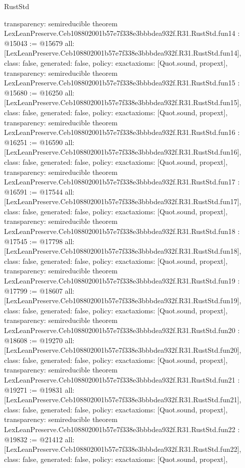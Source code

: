 \begin{lexlean}{RustStd}
\begin{coremodule}
{  transparency: semireducible
}
theorem LexLeanPreserve.Ceb108802001b57e7f338e3bbbdea932f.R31.RustStd.fun14 : @15043 := @15679 {
  all: [LexLeanPreserve.Ceb108802001b57e7f338e3bbbdea932f.R31.RustStd.fun14],
  class: false,
  generated: false,
  policy: exact{axioms: [Quot.sound, propext]},
  transparency: semireducible
}
theorem LexLeanPreserve.Ceb108802001b57e7f338e3bbbdea932f.R31.RustStd.fun15 : @15680 := @16250 {
  all: [LexLeanPreserve.Ceb108802001b57e7f338e3bbbdea932f.R31.RustStd.fun15],
  class: false,
  generated: false,
  policy: exact{axioms: [Quot.sound, propext]},
  transparency: semireducible
}
theorem LexLeanPreserve.Ceb108802001b57e7f338e3bbbdea932f.R31.RustStd.fun16 : @16251 := @16590 {
  all: [LexLeanPreserve.Ceb108802001b57e7f338e3bbbdea932f.R31.RustStd.fun16],
  class: false,
  generated: false,
  policy: exact{axioms: [Quot.sound, propext]},
  transparency: semireducible
}
theorem LexLeanPreserve.Ceb108802001b57e7f338e3bbbdea932f.R31.RustStd.fun17 : @16591 := @17544 {
  all: [LexLeanPreserve.Ceb108802001b57e7f338e3bbbdea932f.R31.RustStd.fun17],
  class: false,
  generated: false,
  policy: exact{axioms: [Quot.sound, propext]},
  transparency: semireducible
}
theorem LexLeanPreserve.Ceb108802001b57e7f338e3bbbdea932f.R31.RustStd.fun18 : @17545 := @17798 {
  all: [LexLeanPreserve.Ceb108802001b57e7f338e3bbbdea932f.R31.RustStd.fun18],
  class: false,
  generated: false,
  policy: exact{axioms: [Quot.sound, propext]},
  transparency: semireducible
}
theorem LexLeanPreserve.Ceb108802001b57e7f338e3bbbdea932f.R31.RustStd.fun19 : @17799 := @18607 {
  all: [LexLeanPreserve.Ceb108802001b57e7f338e3bbbdea932f.R31.RustStd.fun19],
  class: false,
  generated: false,
  policy: exact{axioms: [Quot.sound, propext]},
  transparency: semireducible
}
theorem LexLeanPreserve.Ceb108802001b57e7f338e3bbbdea932f.R31.RustStd.fun20 : @18608 := @19270 {
  all: [LexLeanPreserve.Ceb108802001b57e7f338e3bbbdea932f.R31.RustStd.fun20],
  class: false,
  generated: false,
  policy: exact{axioms: [Quot.sound, propext]},
  transparency: semireducible
}
theorem LexLeanPreserve.Ceb108802001b57e7f338e3bbbdea932f.R31.RustStd.fun21 : @19271 := @19831 {
  all: [LexLeanPreserve.Ceb108802001b57e7f338e3bbbdea932f.R31.RustStd.fun21],
  class: false,
  generated: false,
  policy: exact{axioms: [Quot.sound, propext]},
  transparency: semireducible
}
theorem LexLeanPreserve.Ceb108802001b57e7f338e3bbbdea932f.R31.RustStd.fun22 : @19832 := @21412 {
  all: [LexLeanPreserve.Ceb108802001b57e7f338e3bbbdea932f.R31.RustStd.fun22],
  class: false,
  generated: false,
  policy: exact{axioms: [Quot.sound, propext]},
}
\end{coremodule}
\end{lexlean}
